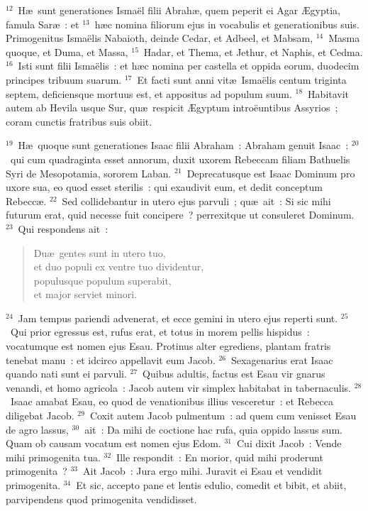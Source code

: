 ${}^{12}$~H\ae\ sunt generationes Isma\"el filii Abrah\ae , quem peperit ei Agar \AE gyptia, famula Sar\ae~: et
${}^{13}$~h\ae c nomina filiorum ejus in vocabulis et generationibus suis. Primogenitus Isma\"elis Nabaioth, deinde Cedar, et Adbeel, et Mabsam,
${}^{14}$~Masma quoque, et Duma, et Massa,
${}^{15}$~Hadar, et Thema, et Jethur, et Naphis, et Cedma.
${}^{16}$~Isti sunt filii Isma\"elis~: et h\ae c nomina per castella et oppida eorum, duodecim principes tribuum suarum.
${}^{17}$~Et facti sunt anni vit\ae\ Isma\"elis centum triginta septem, deficiensque mortuus est, et appositus ad populum suum.
${}^{18}$~Habitavit autem ab Hevila usque Sur, qu\ae\ respicit \AE gyptum intro\"euntibus Assyrios~; coram cunctis fratribus suis obiit.


${}^{19}$~H\ae\ quoque sunt generationes Isaac filii Abraham~: Abraham genuit Isaac~:
${}^{20}$~qui cum quadraginta esset annorum, duxit uxorem Rebeccam filiam Bathuelis Syri de Mesopotamia, sororem Laban.
${}^{21}$~Deprecatusque est Isaac Dominum pro uxore sua, eo quod esset sterilis~: qui exaudivit eum, et dedit conceptum Rebecc\ae .
${}^{22}$~Sed collidebantur in utero ejus parvuli~; qu\ae\ ait~: Si sic mihi futurum erat, quid necesse fuit concipere~? perrexitque ut consuleret Dominum.
${}^{23}$~Qui respondens ait~: \begin{verse}Du\ae\ gentes sunt in utero tuo,\\ et duo populi ex ventre tuo dividentur,\\ populusque populum superabit,\\ et major serviet minori.\end{verse}


${}^{24}$~Jam tempus pariendi advenerat, et ecce gemini in utero ejus reperti sunt.
${}^{25}$~Qui prior egressus est, rufus erat, et totus in morem pellis hispidus~: vocatumque est nomen ejus Esau. Protinus alter egrediens, plantam fratris tenebat manu~: et idcirco appellavit eum Jacob.
${}^{26}$~Sexagenarius erat Isaac quando nati sunt ei parvuli.
${}^{27}$~Quibus adultis, factus est Esau vir gnarus venandi, et homo agricola~: Jacob autem vir simplex habitabat in tabernaculis.
${}^{28}$~Isaac amabat Esau, eo quod de venationibus illius vesceretur~: et Rebecca diligebat Jacob.
${}^{29}$~Coxit autem Jacob pulmentum~: ad quem cum venisset Esau de agro lassus,
${}^{30}$~ait~: Da mihi de coctione hac rufa, quia oppido lassus sum. Quam ob causam vocatum est nomen ejus Edom.
${}^{31}$~Cui dixit Jacob~: Vende mihi primogenita tua.
${}^{32}$~Ille respondit~: En morior, quid mihi proderunt primogenita~?
${}^{33}$~Ait Jacob~: Jura ergo mihi. Juravit ei Esau et vendidit primogenita.
${}^{34}$~Et sic, accepto pane et lentis edulio, comedit et bibit, et abiit, parvipendens quod primogenita vendidisset.

